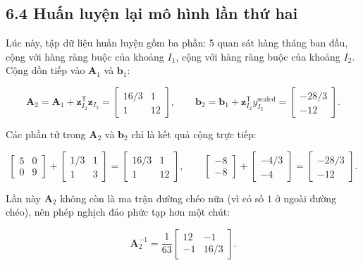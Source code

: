 \documentclass[12pt]{article}
\begin{document}
\subsection{6.4 Huấn luyện lại mô hình lần thứ hai}

Lúc này, tập dữ liệu huấn luyện gồm ba phần: 5 quan sát hàng tháng ban đầu, cộng với hàng ràng buộc của khoảng $I_1$, cộng với hàng ràng buộc của khoảng $I_2$. Cộng dồn tiếp vào $\boldsymbol{A}_1$ và $\boldsymbol{b}_1$:

\[
\boldsymbol{A}_2
=
\boldsymbol{A}_1
+
\boldsymbol{z}_{I_2}^{\mathsf{T}}\boldsymbol{z}_{I_2}
=
\begin{bmatrix}
16/3 & 1\\
1 & 12
\end{bmatrix},
\qquad
\boldsymbol{b}_2
=
\boldsymbol{b}_1
+
\boldsymbol{z}_{I_2}^{\mathsf{T}}y_{I_2}^{\mathrm{scaled}}
=
\begin{bmatrix}
-28/3\\
-12
\end{bmatrix}.
\]

Các phần tử trong $\boldsymbol{A}_2$ và $\boldsymbol{b}_2$ chỉ là kết quả cộng trực tiếp:

\[
\begin{bmatrix}
5 & 0\\
0 & 9
\end{bmatrix}
+
\begin{bmatrix}
1/3 & 1\\
1 & 3
\end{bmatrix}
=
\begin{bmatrix}
16/3 & 1\\
1 & 12
\end{bmatrix},
\qquad
\begin{bmatrix}
-8\\
-8
\end{bmatrix}
+
\begin{bmatrix}
-4/3\\
-4
\end{bmatrix}
=
\begin{bmatrix}
-28/3\\
-12
\end{bmatrix}.
\]

Lần này $\boldsymbol{A}_2$ không còn là ma trận đường chéo nữa (vì có số $1$ ở ngoài đường chéo), nên phép nghịch đảo phức tạp hơn một chút:

\[
\boldsymbol{A}_2^{-1}
=
\frac{1}{63}
\begin{bmatrix}
12 & -1\\
-1 & 16/3
\end{bmatrix}.
\]
\end{document}
